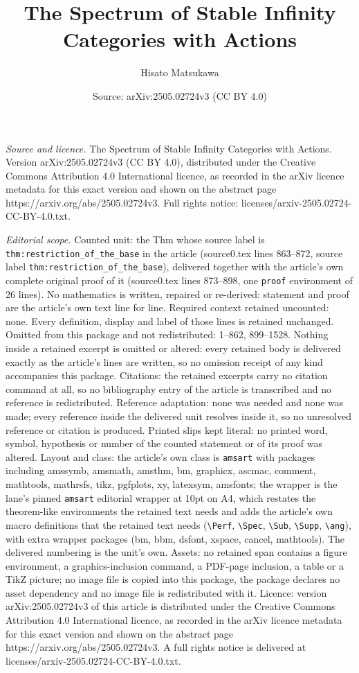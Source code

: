 \documentclass[10pt,a4paper]{amsart}
\title[The Spectrum of Stable Infinity Categories with Actions]{The Spectrum of Stable Infinity Categories with Actions}
\author{Hisato Matsukawa}
\date{Source: arXiv:2505.02724v3 (CC BY 4.0)}
\begin{document}
\maketitle

\noindent\emph{Source and licence.} The Spectrum of Stable Infinity Categories with Actions. Version arXiv:2505.02724v3 (CC BY 4.0), distributed under the Creative Commons Attribution 4.0 International licence, as recorded in the arXiv licence metadata for this exact version and shown on the abstract page https://arxiv.org/abs/2505.02724v3. Full rights notice: licenses/arxiv-2505.02724-CC-BY-4.0.txt.\par\smallskip

\noindent\textit{Editorial scope.} Counted unit: the Thm whose source label is \texttt{thm:restriction\_of\_the\_base} in the article (source0.tex lines 863--872, source label \texttt{thm:restriction\_of\_the\_base}), delivered together with the article's own complete original proof of it (source0.tex lines 873--898, one \texttt{proof} environment of 26 lines). No mathematics is written, repaired or re-derived: statement and proof are the article's own text line for line. Required context retained uncounted: none. Every definition, display and label of those lines is retained unchanged. Omitted from this package and not redistributed: 1--862, 899--1528. Nothing inside a retained excerpt is omitted or altered: every retained body is delivered exactly as the article's lines are written, so no omission receipt of any kind accompanies this package. Citations: the retained excerpts carry no citation command at all, so no bibliography entry of the article is transcribed and no reference is redistributed. Reference adaptation: none was needed and none was made; every reference inside the delivered unit resolves inside it, so no unresolved reference or citation is produced. Printed slips kept literal: no printed word, symbol, hypothesis or number of the counted statement or of its proof was altered. Layout and class: the article's own class is \texttt{amsart} with packages including amssymb, amsmath, amsthm, bm, graphicx, ascmac, comment, mathtools, mathrsfs, tikz, pgfplots, xy, latexsym, amsfonts; the wrapper is the lane's pinned \texttt{amsart} editorial wrapper at 10pt on A4, which restates the theorem-like environments the retained text needs and adds the article's own macro definitions that the retained text needs (\texttt{\textbackslash Perf}, \texttt{\textbackslash Spec}, \texttt{\textbackslash Sub}, \texttt{\textbackslash Supp}, \texttt{\textbackslash ang}), with extra wrapper packages (bm, bbm, dsfont, xspace, cancel, mathtools). The delivered numbering is the unit's own. Assets: no retained span contains a figure environment, a graphics-inclusion command, a PDF-page inclusion, a table or a TikZ picture; no image file is copied into this package, the package declares no asset dependency and no image file is redistributed with it. Licence: version arXiv:2505.02724v3 of this article is distributed under the Creative Commons Attribution 4.0 International licence, as recorded in the arXiv licence metadata for this exact version and shown on the abstract page https://arxiv.org/abs/2505.02724v3. A full rights notice is delivered at licenses/arxiv-2505.02724-CC-BY-4.0.txt. 
\end{document}

